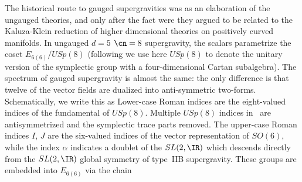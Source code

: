 The historical route to gauged supergravities was as an elaboration of
the
ungauged theories, and only after the fact were they argued to be
related
to the Kaluza-Klein reduction of higher dimensional theories on
positively
curved manifolds.  In ungauged $d=5$ $\cn=8$
supergravity, the scalars parametrize
the
coset $E_{6(6)}/USp(8)$ (following \cite{Cremmer:1980gs} we use here
$USp(8)$ to denote the unitary version of the symplectic group with a
four-dimensional Cartan subalgebra).  The spectrum of gauged
supergravity
is almost the same: the only difference is that twelve of the vector
fields
are dualized into anti-symmetric two-forms.  Schematically, we write
this
as
 Lower-case Roman indices are the eight-valued indices of the
 fundamental
of $USp(8)$.  Multiple $USp(8)$ indices in \SpectrumSplit\ are
antisymmetrized and the symplectic trace parts removed.  The upper-case
Roman indices $I$, $J$ are the six-valued indices of the vector
representation of $SO(6)$, while the index $\alpha$ indicates a
 doublet of
the $SL(2,\IR)$ which descends directly from the $SL(2,\IR)$
 global
symmetry of type~IIB supergravity.  These groups are embedded into
$E_{6(6)}$ via the chain

